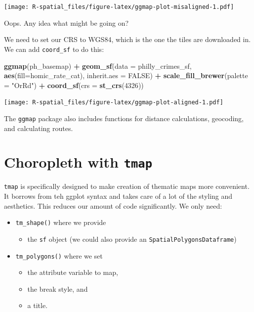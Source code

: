 \documentclass[]{book}
\newenvironment{Shaded}{\begin{snugshade}}{\end{snugshade}}
\newcommand{\KeywordTok}[1]{\textcolor[rgb]{0.13,0.29,0.53}{\textbf{#1}}}
\newcommand{\DataTypeTok}[1]{\textcolor[rgb]{0.13,0.29,0.53}{#1}}
\newcommand{\DecValTok}[1]{\textcolor[rgb]{0.00,0.00,0.81}{#1}}
\newcommand{\StringTok}[1]{\textcolor[rgb]{0.31,0.60,0.02}{#1}}
\newcommand{\OtherTok}[1]{\textcolor[rgb]{0.56,0.35,0.01}{#1}}
\newcommand{\OperatorTok}[1]{\textcolor[rgb]{0.81,0.36,0.00}{\textbf{#1}}}
\newcommand{\NormalTok}[1]{#1}
\providecommand{\tightlist}{%
  \setlength{\itemsep}{0pt}\setlength{\parskip}{0pt}}
\begin{document}
\texttt{[image: R-spatial\_files/figure-latex/ggmap-plot-misaligned-1.pdf]}

Oops. Any idea what might be going on?

We need to set our CRS to WGS84, which is the one the tiles are
downloaded in. We can add \texttt{coord\_sf} to do this:

\begin{Shaded}
\begin{Highlighting}[]
\KeywordTok{ggmap}\NormalTok{(ph_basemap) }\OperatorTok{+}
\StringTok{    }\KeywordTok{geom_sf}\NormalTok{(}\DataTypeTok{data =}\NormalTok{ philly_crimes_sf, }\KeywordTok{aes}\NormalTok{(}\DataTypeTok{fill=}\NormalTok{homic_rate_cat), }\DataTypeTok{inherit.aes =} \OtherTok{FALSE}\NormalTok{) }\OperatorTok{+}
\StringTok{    }\KeywordTok{scale_fill_brewer}\NormalTok{(}\DataTypeTok{palette =} \StringTok{"OrRd"}\NormalTok{) }\OperatorTok{+}
\StringTok{    }\KeywordTok{coord_sf}\NormalTok{(}\DataTypeTok{crs =} \KeywordTok{st_crs}\NormalTok{(}\DecValTok{4326}\NormalTok{))}
\end{Highlighting}
\end{Shaded}

\texttt{[image: R-spatial\_files/figure-latex/ggmap-plot-aligned-1.pdf]}

The \texttt{ggmap} package also includes functions for distance
calculations, geocoding, and calculating routes.

\section{\texorpdfstring{Choropleth with
\texttt{tmap}}{Choropleth with tmap}}\label{choropleth-with-tmap}

\texttt{tmap} is specifically designed to make creation of thematic maps
more convenient. It borrows from teh ggplot syntax and takes care of a
lot of the styling and aesthetics. This reduces our amount of code
significantly. We only need:

\begin{itemize}
\tightlist
\item
  \texttt{tm\_shape()} where we provide

  \begin{itemize}
  \tightlist
  \item
    the \texttt{sf} object (we could also provide an
    \texttt{SpatialPolygonsDataframe})
  \end{itemize}
\item
  \texttt{tm\_polygons()} where we set

  \begin{itemize}
  \tightlist
  \item
    the attribute variable to map,
  \item
    the break style, and
  \item
    a title.
  \end{itemize}
\end{itemize}
\end{document}
